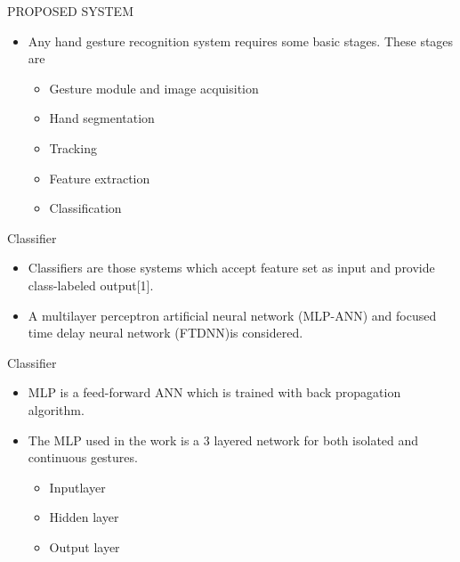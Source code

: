 \documentclass{beamer}
\begin{document}
\begin{frame}{PROPOSED SYSTEM}
\vspace{0.5cm}
 \begin{itemize}
\item Any hand gesture recognition system requires some basic
stages. These stages are
\vspace{.5 cm}
 \begin{itemize}
\item Gesture module and image acquisition
\item Hand segmentation
\item Tracking
\item Feature extraction
\item \alert{Classification}

\end{itemize}
\end{itemize}
\end{frame} 

\begin{frame}{Classifier}
\begin{itemize}
\item Classifiers are those systems which accept feature set
as input and provide class-labeled output[1].
\linebreak
\item A
multilayer perceptron artificial neural network (MLP-ANN)
and focused time delay neural network (FTDNN)is considered.

\end{itemize}
\end{frame}

\begin{frame}{Classifier}
\begin{itemize}
\item MLP is a feed-forward ANN which is trained with back
propagation algorithm.
\linebreak
\item The MLP used in the work is a 3
layered network for both isolated and continuous gestures.
\linebreak
\begin{itemize}
\item Inputlayer
\item Hidden layer
\item Output layer
\end{itemize}
\end{itemize}
\end{frame}
\end{document}

